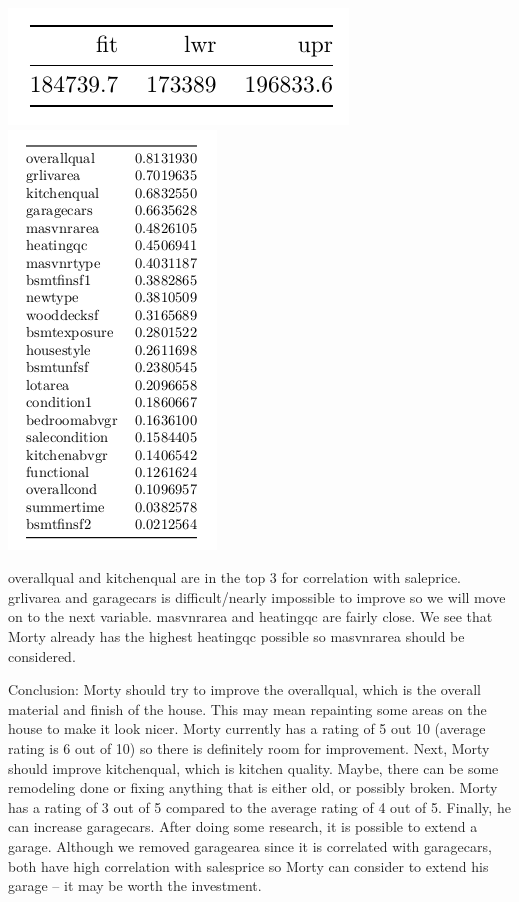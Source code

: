 \documentclass[12pt]{article}
\begin{document}
\begin{flushleft}
\begin{flushleft}
\begin{flushleft}
\centering
    \vspace*{0.5 cm}
    \includegraphics[scale = 0.5]{confint.png}\\[1.0 cm]	

\centering
    \vspace*{0.5 cm}
    \includegraphics[scale = 0.5]{cor.png}\\[1.0 cm]	
    
\begin{flushleft}
overallqual and kitchenqual are in the top 3 for correlation with saleprice. grlivarea and garagecars is difficult/nearly impossible to improve so we will move on to the next variable. masvnrarea and heatingqc are fairly close. We see that Morty already has the highest heatingqc possible so masvnrarea should be considered.

Conclusion: Morty should try to improve the overallqual, which is the overall material and finish of the house. This may mean repainting some areas on the house to make it look nicer. Morty currently has a rating of 5 out 10 (average rating is 6 out of 10) so there is definitely room for improvement. Next, Morty should improve kitchenqual, which is kitchen quality. Maybe, there can be some remodeling done or fixing anything that is either old, or possibly broken. Morty has a rating of 3 out of 5 compared to the average rating of 4 out of 5. Finally, he can increase garagecars. After doing some research, it is possible to extend a garage. Although we removed garagearea since it is correlated with garagecars, both have high correlation with salesprice so Morty can consider to extend his garage -- it may be worth the investment. 


\end{flushleft}
\end{flushleft}
\end{flushleft}
\end{flushleft}
\end{document}
